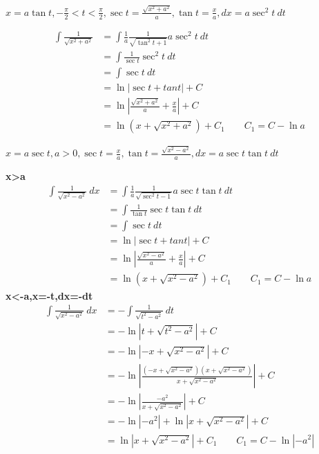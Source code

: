 \centerline{$x=a\tan t,-\frac{\pi}{2}<t<\frac{\pi}{2},\sec t=\frac{\sqrt{x^2+a^2}}{a},\tan t=\frac{x}{a},dx=a\sec^2t\ dt$}
\vspace{-6mm}
\begin{align*}
        \int \frac{1}{\sqrt{x^2+a^2}}&=\int\frac{1}{a} \frac{1}{\sqrt{\tan^2t+1}}a\sec^2t\ dt\\
        &=\int \frac{1}{\sec t}\sec^2t\ dt\\
        &=\int \sec t \ dt\\
        &=\ln\left|\sec t+ tan t\right|+C\\
        &=\ln\left|\frac{\sqrt{x^2+a^2}}{a}+ \frac{x}{a}\right|+C\\
        &=\ln(x+\sqrt{x^2+a^2})+C_1\qquad C_1=C-\ln a
\end{align*}
\centerline{$x=a\sec t,a>0,\sec t =\frac{x}{a},\tan t=\frac{\sqrt{x^2-a^2}}{a},dx=a\sec t\tan t\ dt$}
\textbf{x>a}
\begin{align*}
        \int \frac{1}{\sqrt{x^2-a^2}}\ dx&=\int\frac{1}{a} \frac{1}{\sqrt{\sec^2t-1}}a\sec t\tan t\ dt\\
        &=\int \frac{1}{\tan t}\sec t\tan t\ dt\\
        &=\int \sec t \ dt\\
        &=\ln\left|\sec t+ tan t\right|+C\\
        &=\ln\left|\frac{\sqrt{x^2-a^2}}{a}+ \frac{x}{a}\right|+C\\
        &=\ln(x+\sqrt{x^2-a^2})+C_1\qquad C_1=C-\ln a
\end{align*}
\textbf{x<-a,x=-t,dx=-dt}
\begin{align*}
        \int \frac{1}{\sqrt{x^2-a^2}} \ dx&=-\int \frac{1}{\sqrt{t^2-a^2}} \ dt\\
        &=-\ln \left|t+\sqrt{t^2-a^2}\right|+C \\
        &=-\ln \left|-x+\sqrt{x^2-a^2}\right|+C\\
        &=-\ln \left|\frac{(-x+\sqrt{x^2-a^2})(x+\sqrt{x^2-a^2})}{x+\sqrt{x^2-a^2}}\right|+C\\
        &=-\ln \left|\frac{-a^2}{x+\sqrt{x^2-a^2}}\right|+C\\
        &=-\ln\left|-a^2\right| +\ln\left|{x+\sqrt{x^2-a^2}}\right|+C\\
        &=\ln\left|{x+\sqrt{x^2-a^2}}\right|+C_1\qquad C_1=C-\ln\left|-a^2\right|
\end{align*}
